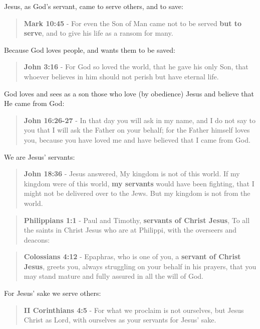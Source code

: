 \documentclass[11pt]{article}
\begin{document}
Jesus, as God's servant, came to serve others, and to save:

\begin{quote}
\textbf{Mark 10:45} - For even the Son of Man came not to be served \textbf{but to serve}, and to give his life as a ransom for many.
\end{quote}

Because God loves people, and wants them to be saved:

\begin{quote}
\textbf{John 3:16} - For God so loved the world, that he gave his only Son, that whoever believes in him should not perish but have eternal life.
\end{quote}

God loves and sees as a son those who love (by obedience) Jesus and believe that He came from God:

\begin{quote}
\textbf{John 16:26-27} - In that day you will ask in my name, and I do not say to you that I will ask the Father on your behalf; for the Father himself loves you, because you have loved me and have believed that I came from God.
\end{quote}

We are Jesus' servants:

\begin{quote}
\textbf{John 18:36} - Jesus answered, My kingdom is not of this world. If my kingdom were of this world, \textbf{my servants} would have been fighting, that I might not be delivered over to the Jews. But my kingdom is not from the world.
\end{quote}

\begin{quote}
\textbf{Philippians 1:1} - Paul and Timothy, \textbf{servants of Christ Jesus}, To all the saints in Christ Jesus who are at Philippi, with the overseers and deacons:
\end{quote}

\begin{quote}
\textbf{Colossians 4:12} - Epaphras, who is one of you, a \textbf{servant of Christ Jesus}, greets you, always struggling on your behalf in his prayers, that you may stand mature and fully assured in all the will of God.
\end{quote}

For Jesus' sake we serve others:

\begin{quote}
\textbf{II Corinthians 4:5} - For what we proclaim is not ourselves, but Jesus Christ as Lord, with ourselves as your servants for Jesus' sake.
\end{quote}
\end{document}
